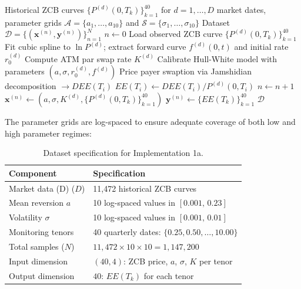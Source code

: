   \begin{algorithm}
  \caption{Dataset Generation for Implementation 1a}\label{alg:datagen_1a}
  \begin{algorithmic}[1]
      \Require Historical ZCB curves $\{P^{(d)}(0, T_k)\}_{k=1}^{40}$ for $d = 1, \ldots, D$ market dates, parameter grids $\mathcal{A} = \{a_1, \ldots, a_{10}\}$ and $\mathcal{S} =
  \{\sigma_1, \ldots, \sigma_{10}\}$
      \Ensure Dataset $\mathcal{D} = \{(\mathbf{x}^{(n)}, \mathbf{y}^{(n)})\}_{n=1}^{N}$
      \State $n \leftarrow 0$
          \State Load observed ZCB curve $\{P^{(d)}(0, T_k)\}_{k=1}^{40}$
          \State Fit cubic spline to $\ln P^{(d)}$; extract forward curve $f^{(d)}(0, t)$ and initial rate $r_0^{(d)}$
          \State Compute ATM par swap rate $K^{(d)}$
                  \State Calibrate Hull-White model with parameters $(a, \sigma, r_0^{(d)}, f^{(d)})$
                      \State Price payer swaption via Jamshidian decomposition $\rightarrow DEE(T_i)$
                      \State $EE(T_i) \leftarrow DEE(T_i) / P^{(d)}(0, T_i)$
                  \EndFor
                  \State $n \leftarrow n + 1$
                  \State $\mathbf{x}^{(n)} \leftarrow (a, \sigma, K^{(d)}, \{P^{(d)}(0, T_k)\}_{k=1}^{40})$ 
                  \State $\mathbf{y}^{(n)} \leftarrow \{EE(T_k)\}_{k=1}^{40}$ 
              \EndFor
          \EndFor
      \EndFor
      \State \Return $\mathcal{D}$
  \end{algorithmic}
  \end{algorithm}

  \noindent
  The parameter grids are log-spaced to ensure adequate coverage of both low and high parameter regimes:

  \begin{table}[htbp]
  \centering
  \caption{Dataset specification for Implementation 1a.}\label{tab:dataset_1a}
  \begin{tabular}{ll}
  \toprule
  \textbf{Component} & \textbf{Specification} \\
  \midrule
  Market data (D) ($D$) & 11{,}472 historical ZCB curves \\
  Mean reversion $a$ & 10 log-spaced values in $[0.001,\, 0.23]$ \\
  Volatility $\sigma$ & 10 log-spaced values in $[0.001,\, 0.01]$ \\
  Monitoring tenors & 40 quarterly dates: $\{0.25, 0.50, \ldots, 10.00\}$ \\
  Total samples ($N$) & $11{,}472 \times 10 \times 10 = 1{,}147{,}200$ \\
  Input dimension & $(40, 4)$: ZCB price, $a$, $\sigma$, $K$ per tenor \\
  Output dimension & $40$: $EE(T_k)$ for each tenor \\
  \bottomrule
  \end{tabular}
  \end{table}


